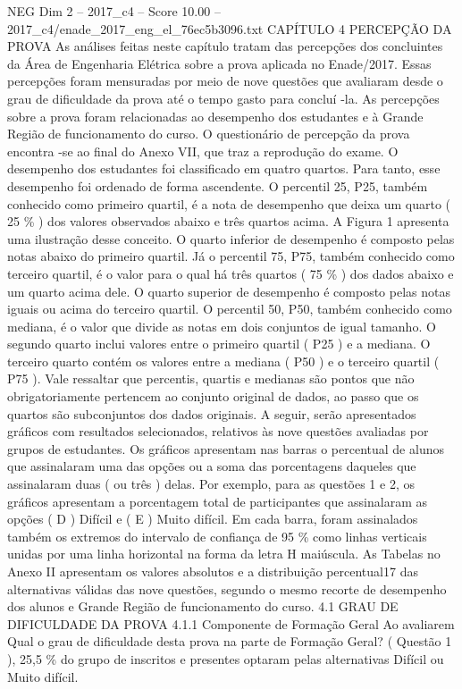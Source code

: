 \begin{textsample}{NEG Dim 2 – 2017\_c4 – Score 10.00 – 2017\_c4/enade\_2017\_eng\_el\_76ec5b3096.txt}  \label{ex:f2_neg_344}
CAPÍTULO 4 PERCEPÇÃO DA PROVA As análises feitas neste capítulo tratam das percepções dos concluintes da Área de Engenharia Elétrica sobre a prova aplicada no Enade/2017.
Essas percepções foram mensuradas por meio de nove questões que avaliaram desde o grau de dificuldade da prova até o tempo gasto para concluí -la.
As percepções sobre a prova foram relacionadas ao desempenho dos estudantes e à Grande Região de funcionamento do curso.
O questionário de percepção da prova encontra -se ao final do Anexo VII, que traz a reprodução do exame.
O desempenho dos estudantes foi classificado em quatro quartos.
Para tanto, esse desempenho foi ordenado de forma ascendente.
O percentil 25, P25, também conhecido como primeiro quartil, é a nota de desempenho que deixa um quarto ( 25 \% ) dos valores observados abaixo e três quartos acima.
A Figura 1 apresenta uma ilustração desse conceito.
O quarto inferior de desempenho é composto pelas notas abaixo do primeiro quartil.
Já o percentil 75, P75, também conhecido como terceiro quartil, é o valor para o qual há três quartos ( 75 \% ) dos dados abaixo e um quarto acima dele.
O quarto superior de desempenho é composto pelas notas iguais ou acima do terceiro quartil.
O percentil 50, P50, também conhecido como mediana, é o valor que divide as notas em dois conjuntos de igual tamanho.
O segundo quarto inclui valores entre o primeiro quartil ( P25 ) e a mediana.
O terceiro quarto contém os valores entre a mediana ( P50 ) e o terceiro quartil ( P75 ).
Vale ressaltar que percentis, quartis e medianas são pontos que não obrigatoriamente pertencem ao conjunto original de dados, ao passo que os quartos são subconjuntos dos dados originais.
A seguir, serão apresentados gráficos com resultados selecionados, relativos às nove questões avaliadas por grupos de estudantes.
Os gráficos apresentam nas barras o percentual de alunos que assinalaram uma das opções ou a soma das porcentagens daqueles que assinalaram duas ( ou três ) delas.
Por exemplo, para as questões 1 e 2, os gráficos apresentam a porcentagem total de participantes que assinalaram as opções ( D ) Difícil e ( E ) Muito difícil.
Em cada barra, foram assinalados também os extremos do intervalo de confiança de 95 \% como linhas verticais unidas por uma linha horizontal na forma da letra H maiúscula.
As Tabelas no Anexo II apresentam os valores absolutos e a distribuição percentual17 das alternativas válidas das nove questões, segundo o mesmo recorte de desempenho dos alunos e Grande Região de funcionamento do curso. 4.1 GRAU DE DIFICULDADE DA PROVA 4.1.1 Componente de Formação Geral Ao avaliarem Qual o grau de dificuldade desta prova na parte de Formação Geral? ( Questão 1 ), 25,5 \% do grupo de inscritos e presentes optaram pelas alternativas Difícil ou Muito difícil.

\end{textsample}
